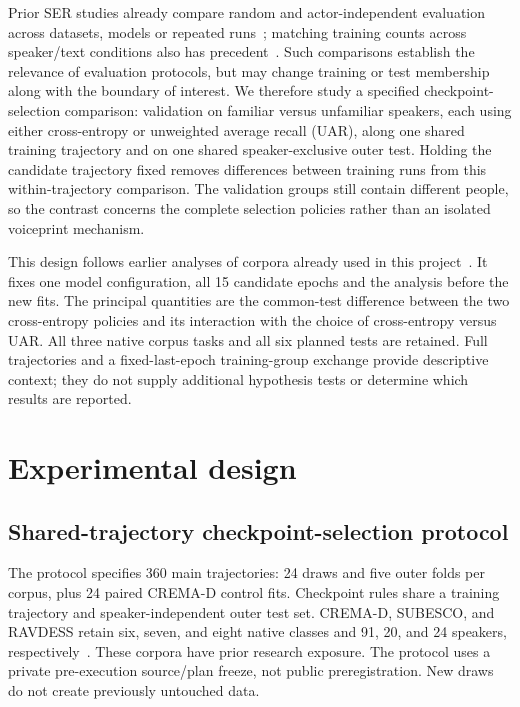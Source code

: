 \documentclass[letterpaper]{article}
\begin{document}
Prior SER studies already compare random and actor-independent evaluation across datasets, models or repeated runs~\cite{ibrahim,zielonka,kumari}; matching training counts across speaker/text conditions also has precedent~\cite{atmaja}. Such comparisons establish the relevance of evaluation protocols, but may change training or test membership along with the boundary of interest. We therefore study a specified checkpoint-selection comparison: validation on familiar versus unfamiliar speakers, each using either cross-entropy or unweighted average recall (UAR), along one shared training trajectory and on one shared speaker-exclusive outer test. Holding the candidate trajectory fixed removes differences between training runs from this within-trajectory comparison. The validation groups still contain different people, so the contrast concerns the complete selection policies rather than an isolated voiceprint mechanism.

This design follows earlier analyses of corpora already used in this project~\cite{artifact}. It fixes one model configuration, all 15 candidate epochs and the analysis before the new fits. The principal quantities are the common-test difference between the two cross-entropy policies and its interaction with the choice of cross-entropy versus UAR. All three native corpus tasks and all six planned tests are retained. Full trajectories and a fixed-last-epoch training-group exchange provide descriptive context; they do not supply additional hypothesis tests or determine which results are reported.


\section{Experimental design}
\subsection{Shared-trajectory checkpoint-selection protocol}
\label{sec:final-program-methods}

The protocol specifies 360 main trajectories: 24 draws and five outer folds
per corpus, plus 24 paired CREMA-D control fits. Checkpoint rules share a
training trajectory and speaker-independent outer test set. CREMA-D,
SUBESCO, and RAVDESS retain six, seven, and eight native classes and
91, 20, and 24 speakers, respectively~\cite{cremad,subesco,ravdess}.
These corpora have prior research exposure. The protocol uses a private
pre-execution source/plan freeze, not public preregistration. New draws do
not create previously untouched data.
\end{document}
